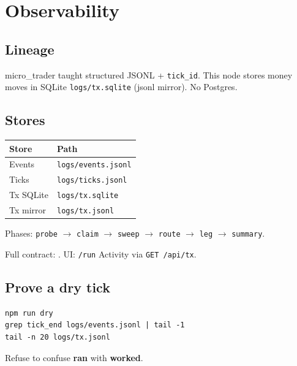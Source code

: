 \chapter{Observability}

\section{Lineage}

micro\_trader taught structured JSONL + \texttt{tick\_id}. This node stores money moves in SQLite \texttt{logs/tx.sqlite} (jsonl mirror). No Postgres.

\section{Stores}

\begin{center}
\begin{tabular}{@{}ll@{}}
\toprule
Store & Path \\
\midrule
Events & \texttt{logs/events.jsonl} \\
Ticks & \texttt{logs/ticks.jsonl} \\
Tx SQLite & \texttt{logs/tx.sqlite} \\
Tx mirror & \texttt{logs/tx.jsonl} \\
\bottomrule
\end{tabular}
\end{center}

Phases: \texttt{probe} $\to$ \texttt{claim} $\to$ \texttt{sweep} $\to$ \texttt{route} $\to$ \texttt{leg} $\to$ \texttt{summary}.

Full contract: . UI: \texttt{/run} Activity via \texttt{GET /api/tx}.

\section{Prove a dry tick}

\begin{lstlisting}
npm run dry
grep tick_end logs/events.jsonl | tail -1
tail -n 20 logs/tx.jsonl
\end{lstlisting}

Refuse to confuse \textbf{ran} with \textbf{worked}.
